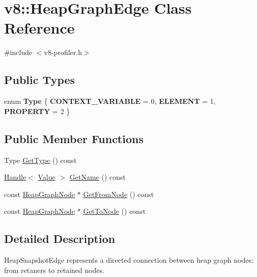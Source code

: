 \hypertarget{classv8_1_1_heap_graph_edge}{}\section{v8\+:\+:Heap\+Graph\+Edge Class Reference}
\label{classv8_1_1_heap_graph_edge}


{\ttfamily \#include $<$v8-\/profiler.\+h$>$}

\subsection*{Public Types}
\begin{DoxyCompactItemize}
\item 
\hypertarget{classv8_1_1_heap_graph_edge_a252500cf4307fe9e4fcb0335a907259b}{}enum {\bfseries Type} \{ {\bfseries C\+O\+N\+T\+E\+X\+T\+\_\+\+V\+A\+R\+I\+A\+B\+L\+E} = 0, 
{\bfseries E\+L\+E\+M\+E\+N\+T} = 1, 
{\bfseries P\+R\+O\+P\+E\+R\+T\+Y} = 2
 \}\label{classv8_1_1_heap_graph_edge_a252500cf4307fe9e4fcb0335a907259b}

\end{DoxyCompactItemize}
\subsection*{Public Member Functions}
\begin{DoxyCompactItemize}
\item 
Type \hyperlink{classv8_1_1_heap_graph_edge_a7f4923098074ee4c47d901f363728d08}{Get\+Type} () const 
\item 
\hyperlink{classv8_1_1_handle}{Handle}$<$ \hyperlink{classv8_1_1_value}{Value} $>$ \hyperlink{classv8_1_1_heap_graph_edge_aa91362db6bfdbecfc48d3ba57d292705}{Get\+Name} () const 
\item 
const \hyperlink{classv8_1_1_heap_graph_node}{Heap\+Graph\+Node} $\ast$ \hyperlink{classv8_1_1_heap_graph_edge_acd43a5082f1862b7c0c0094fc75af631}{Get\+From\+Node} () const 
\item 
const \hyperlink{classv8_1_1_heap_graph_node}{Heap\+Graph\+Node} $\ast$ \hyperlink{classv8_1_1_heap_graph_edge_ad8fd8fa121a0e778a8b120a0c5fa227c}{Get\+To\+Node} () const 
\end{DoxyCompactItemize}


\subsection{Detailed Description}
Heap\+Snapshot\+Edge represents a directed connection between heap graph nodes\+: from retaners to retained nodes. 

